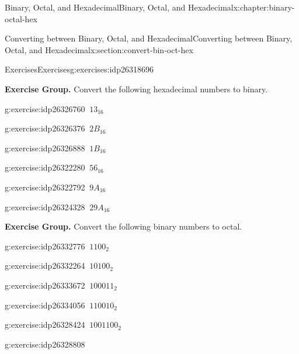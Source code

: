 \documentclass[twoside,10pt,]{book}
\numberwithin{equation}{section}
\begin{document}
\begin{chapterptx}{Binary, Octal, and Hexadecimal}{}{Binary, Octal, and Hexadecimal}{}{}{x:chapter:binary-octal-hex}
\begin{sectionptx}{Converting between Binary, Octal, and Hexadecimal}{}{Converting between Binary, Octal, and Hexadecimal}{}{}{x:section:convert-bin-oct-hex}
\begin{exercises-subsection}{Exercises}{}{Exercises}{}{}{g:exercises:idp26318696}
\par\medskip\noindent
\par\medskip\noindent%
\textbf{Exercise Group.}\space\space%
Convert the following hexadecimal numbers to binary.\begin{exercisegroup}
\begin{divisionexerciseeg}{7}{}{}{g:exercise:idp26326760}%
\(\ 13_{16}\)\end{divisionexerciseeg}%
\begin{divisionexerciseeg}{8}{}{}{g:exercise:idp26326376}%
\(\ 2B_{16}\)\end{divisionexerciseeg}%
\begin{divisionexerciseeg}{9}{}{}{g:exercise:idp26326888}%
\(\ 1B_{16}\)\end{divisionexerciseeg}%
\begin{divisionexerciseeg}{10}{}{}{g:exercise:idp26322280}%
\(\ 56_{16}\)\end{divisionexerciseeg}%
\begin{divisionexerciseeg}{11}{}{}{g:exercise:idp26322792}%
\(\ 9A_{16}\)\end{divisionexerciseeg}%
\begin{divisionexerciseeg}{12}{}{}{g:exercise:idp26324328}%
\(\ 29A_{16}\)\end{divisionexerciseeg}%
\end{exercisegroup}
\par\medskip\noindent
\par\medskip\noindent%
\textbf{Exercise Group.}\space\space%
Convert the following binary numbers to octal.\begin{exercisegroup}
\begin{divisionexerciseeg}{13}{}{}{g:exercise:idp26332776}%
\(\ 1100_2\)\end{divisionexerciseeg}%
\begin{divisionexerciseeg}{14}{}{}{g:exercise:idp26332264}%
\(\ 10100_2\)\end{divisionexerciseeg}%
\begin{divisionexerciseeg}{15}{}{}{g:exercise:idp26333672}%
\(\ 100011_2\)\end{divisionexerciseeg}%
\begin{divisionexerciseeg}{16}{}{}{g:exercise:idp26334056}%
\(\ 110010_2\)\end{divisionexerciseeg}%
\begin{divisionexerciseeg}{17}{}{}{g:exercise:idp26328424}%
\(\ 1001100_2\)\end{divisionexerciseeg}%
\begin{divisionexerciseeg}{18}{}{}{g:exercise:idp26328808}%

\end{divisionexerciseeg}
\end{exercisegroup}
\end{exercises-subsection}
\end{sectionptx}
\end{chapterptx}
\end{document}

